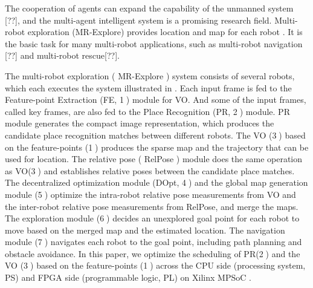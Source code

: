 \label{sec:intro}

The cooperation of agents can expand the capability of the unmanned system [??], and the multi-agent intelligent system is a promising research field.
Multi-robot exploration (MR-Explore) \cite{corah2019communication} provides location and map for each robot . It is the basic task for many multi-robot applications, such as multi-robot navigation [??] and multi-robot rescue[??].

The multi-robot exploration ( MR-Explore ) system \cite{corah2019communication, cieslewski2018data} consists of several robots, which each executes the system illustrated in . Each input frame is fed to the Feature-point Extraction (FE, \textcircled{1}) module for VO. 
And some of the input frames, called key frames, are also fed to the Place Recognition (PR, \textcircled{2}) module.
PR module generates the compact image representation, which produces the candidate place recognition matches between different robots. The VO (\textcircled{3}) based on the feature-points (\textcircled{1}) produces the sparse map and the trajectory that can be used for location. The relative pose ( RelPose ) module does the same operation as VO(\textcircled{3}) and establishes relative poses between the candidate place matches. The decentralized optimization module (DOpt, \textcircled{4}) and the global map generation module (\textcircled{5}) optimize the intra-robot relative pose measurements from VO and the inter-robot relative pose measurements from RelPose, and merge the maps. The exploration module (\textcircled{6}) decides an unexplored goal point for each robot to move based on the merged map and the estimated location. The navigation module (\textcircled{7}) navigates each robot to the goal point, including path planning and obstacle avoidance.
In this paper, we optimize the scheduling of PR(\textcircled{2}) and the VO (\textcircled{3}) based on the feature-points (\textcircled{1}) across the CPU side (processing system, PS) and FPGA side (programmable logic, PL) on Xilinx MPSoC \cite{MPSoC}.


